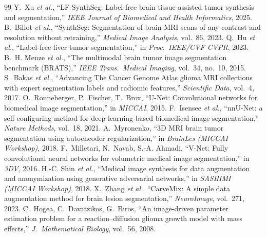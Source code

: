 \documentclass[10pt,a4paper,twocolumn,twoside]{article}
\begin{document}
\begin{thebibliography}{99}\small
{} Y.~Xu \emph{et al.}, ``LF-SynthSeg: Label-free brain tissue-assisted tumor synthesis and segmentation,'' \emph{IEEE Journal of Biomedical and Health Informatics}, 2025.
 B.~Billot \emph{et al.}, ``SynthSeg: Segmentation of brain MRI scans of any contrast and resolution without retraining,'' \emph{Medical Image Analysis}, vol.~86, 2023.
 Q.~Hu \emph{et al.}, ``Label-free liver tumor segmentation,'' in \emph{Proc.\ IEEE/CVF CVPR}, 2023.
 B.~H. Menze \emph{et al.}, ``The multimodal brain tumor image segmentation benchmark (BRATS),'' \emph{IEEE Trans.\ Medical Imaging}, vol.~34, no.~10, 2015.
 S.~Bakas \emph{et al.}, ``Advancing The Cancer Genome Atlas glioma MRI collections with expert segmentation labels and radiomic features,'' \emph{Scientific Data}, vol.~4, 2017.
 O.~Ronneberger, P.~Fischer, T.~Brox, ``U-Net: Convolutional networks for biomedical image segmentation,'' in \emph{MICCAI}, 2015.
 F.~Isensee \emph{et al.}, ``nnU-Net: a self-configuring method for deep learning-based biomedical image segmentation,'' \emph{Nature Methods}, vol.~18, 2021.
 A.~Myronenko, ``3D MRI brain tumor segmentation using autoencoder regularization,'' in \emph{BrainLes (MICCAI Workshop)}, 2018.
 F.~Milletari, N.~Navab, S.-A. Ahmadi, ``V-Net: Fully convolutional neural networks for volumetric medical image segmentation,'' in \emph{3DV}, 2016.
 H.-C. Shin \emph{et al.}, ``Medical image synthesis for data augmentation and anonymization using generative adversarial networks,'' in \emph{SASHIMI (MICCAI Workshop)}, 2018.
 X.~Zhang \emph{et al.}, ``CarveMix: A simple data augmentation method for brain lesion segmentation,'' \emph{NeuroImage}, vol.~271, 2023.
 C.~Hogea, C.~Davatzikos, G.~Biros, ``An image-driven parameter estimation problem for a reaction--diffusion glioma growth model with mass effects,'' \emph{J.\ Mathematical Biology}, vol.~56, 2008.
\end{thebibliography}
\end{document}
